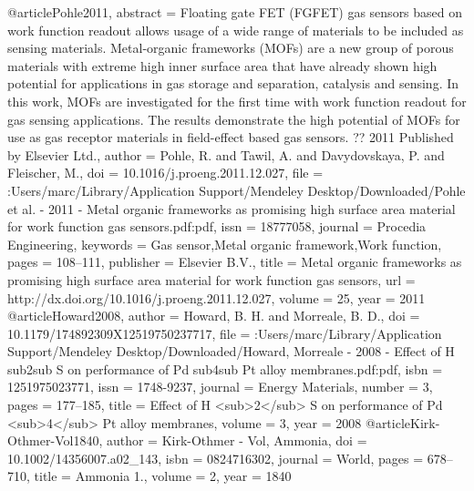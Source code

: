 @article{Pohle2011,
abstract = {Floating gate FET (FGFET) gas sensors based on work function readout allows usage of a wide range of materials to be included as sensing materials. Metal-organic frameworks (MOFs) are a new group of porous materials with extreme high inner surface area that have already shown high potential for applications in gas storage and separation, catalysis and sensing. In this work, MOFs are investigated for the first time with work function readout for gas sensing applications. The results demonstrate the high potential of MOFs for use as gas receptor materials in field-effect based gas sensors. ?? 2011 Published by Elsevier Ltd.},
author = {Pohle, R. and Tawil, A. and Davydovskaya, P. and Fleischer, M.},
doi = {10.1016/j.proeng.2011.12.027},
file = {:Users/marc/Library/Application Support/Mendeley Desktop/Downloaded/Pohle et al. - 2011 - Metal organic frameworks as promising high surface area material for work function gas sensors.pdf:pdf},
issn = {18777058},
journal = {Procedia Engineering},
keywords = {Gas sensor,Metal organic framework,Work function},
pages = {108--111},
publisher = {Elsevier B.V.},
title = {{Metal organic frameworks as promising high surface area material for work function gas sensors}},
url = {http://dx.doi.org/10.1016/j.proeng.2011.12.027},
volume = {25},
year = {2011}
}
@article{Howard2008,
author = {Howard, B. H. and Morreale, B. D.},
doi = {10.1179/174892309X12519750237717},
file = {:Users/marc/Library/Application Support/Mendeley Desktop/Downloaded/Howard, Morreale - 2008 - Effect of H sub2sub S on performance of Pd sub4sub Pt alloy membranes.pdf:pdf},
isbn = {1251975023771},
issn = {1748-9237},
journal = {Energy Materials},
number = {3},
pages = {177--185},
title = {{Effect of H {\textless}sub{\textgreater}2{\textless}/sub{\textgreater} S on performance of Pd {\textless}sub{\textgreater}4{\textless}/sub{\textgreater} Pt alloy membranes}},
volume = {3},
year = {2008}
}
@article{Kirk-Othmer-Vol1840,
author = {{Kirk-Othmer - Vol}, Ammonia},
doi = {10.1002/14356007.a02_143},
isbn = {0824716302},
journal = {World},
pages = {678--710},
title = {{Ammonia 1.}},
volume = {2},
year = {1840}
}
